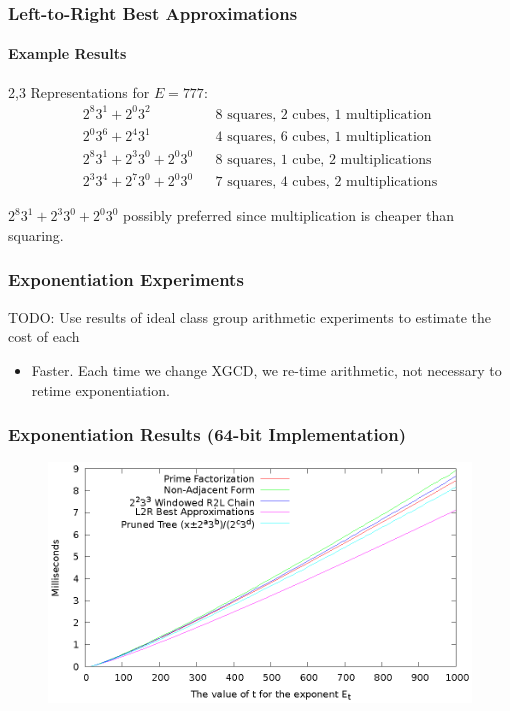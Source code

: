 \documentclass{beamer}
\begin{document}
\begin{frame}
\frametitle{Left-to-Right Best Approximations}
\framesubtitle{Example Results}
2,3 Representations for $E=777$:
\begin{align*}
2^8 3^1 + 2^0 3^2 && \textrm{8 squares, 2 cubes, 1 multiplication} \\
2^0 3^6 + 2^4 3^1 && \textrm{4 squares, 6 cubes, 1 multiplication} \\
2^8 3^1 + 2^3 3^0 + 2^0 3^0 && \textrm{8 squares, 1 cube, 2 multiplications} \\
2^3 3^4 + 2^7 3^0 + 2^0 3^0 && \textrm{7 squares, 4 cubes, 2 multiplications}
\end{align*}

\bigskip
$2^8 3^1 + 2^3 3^0 + 2^0 3^0$ possibly preferred since multiplication is cheaper than squaring.
\end{frame}

\begin{frame}
\frametitle{Exponentiation Experiments}
TODO: Use results of ideal class group arithmetic experiments to estimate the cost of each
\begin{itemize}
\item Faster.  Each time we change XGCD, we re-time arithmetic, not necessary to retime exponentiation.
\end{itemize}
\end{frame}

\begin{frame}
\frametitle{Exponentiation Results (64-bit Implementation)}

\begin{figure}
\includegraphics[scale=0.86]{winners-64}
\end{figure}

\end{frame}
\end{document}
